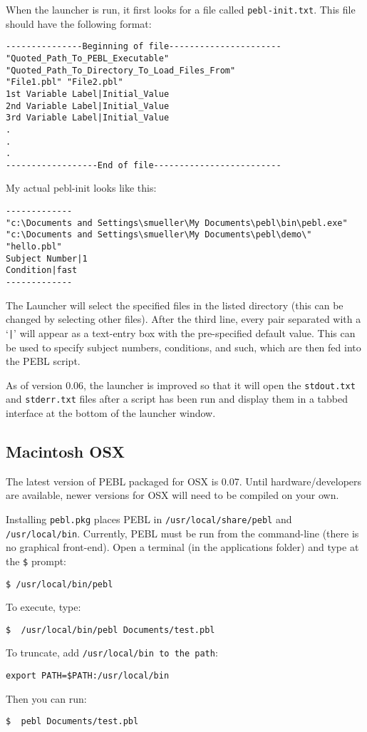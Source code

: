 When the launcher is run, it first looks for a file called
\texttt{pebl-init.txt}. This file should have the following format:
\begin{verbatim}
---------------Beginning of file----------------------
"Quoted_Path_To_PEBL_Executable"
"Quoted_Path_To_Directory_To_Load_Files_From"
"File1.pbl" "File2.pbl"
1st Variable Label|Initial_Value
2nd Variable Label|Initial_Value
3rd Variable Label|Initial_Value
.
.
.
------------------End of file-------------------------
\end{verbatim}
My actual pebl-init looks like this:
\begin{verbatim}
-------------
"c:\Documents and Settings\smueller\My Documents\pebl\bin\pebl.exe"
"c:\Documents and Settings\smueller\My Documents\pebl\demo\"
"hello.pbl"
Subject Number|1
Condition|fast
-------------
\end{verbatim}


The Launcher will select the specified files in the listed directory
(this can be changed by selecting other files).  After the third line,
every pair separated with a `\texttt{|}' will appear as a text-entry
box with the pre-specified default value. This can be used to specify
subject numbers, conditions, and such, which are then fed into the
PEBL script.

As of version 0.06, the launcher is improved so that it will open the
\verb+stdout.txt+ and \verb+stderr.txt+ files after a script has been run and
display them in a tabbed interface at the bottom of the launcher
window.

\subsection{ Macintosh OSX}

The latest version of PEBL packaged for OSX is 0.07.  Until hardware/developers are available, newer versions for OSX will need to be compiled on your own.

Installing \texttt{pebl.pkg} places PEBL in
\texttt{/usr/local/share/pebl} and \texttt{/usr/local/bin}.
Currently, PEBL must be run from the command-line (there is no
graphical front-end).  Open a terminal (in the applications folder)
and type at the \texttt{\$} prompt:
\begin{verbatim}
$ /usr/local/bin/pebl
\end{verbatim}
To execute, type:
\begin{verbatim}
$  /usr/local/bin/pebl Documents/test.pbl
\end{verbatim}
To truncate, add \texttt{/usr/local/bin to the path}:
\begin{verbatim}
export PATH=$PATH:/usr/local/bin
\end{verbatim}
Then you can run:
\begin{verbatim}
$  pebl Documents/test.pbl
\end{verbatim}

